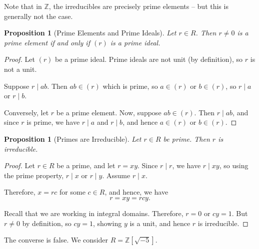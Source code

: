 \documentclass{article}
\newtheorem{proposition}[theorem]{Proposition}
\theoremstyle{definition}
\theoremstyle{remark}
\newcommand{\pqty}[1]{\left(#1\right)}
\newcommand{\bqty}[1]{\left[#1\right]}
\newcommand{\divides}{\mid}
\newcommand{\ZZ}{\mathbb{Z}}
\begin{document}
Note that in \(\ZZ\), the irreducibles are precisely prime elements -- but this is generally not the case.

\begin{proposition}[Prime Elements and Prime Ideals]
    \label{prop:prime-element-ideal}%
    Let \(r \in R\). Then \(r \neq 0\) is a prime element if and only if \(\pqty{r}\) is a prime ideal.
\end{proposition}

\begin{proof}
    Let \(\pqty{r}\) be a prime ideal. Prime ideals are not unit (by definition), so \(r\) is not a unit.

    Suppose \(r \divides ab\). Then \(ab \in \pqty{r}\) which is prime, so \(a \in \pqty{r}\) or \(b \in \pqty{r}\), so \(r \divides a\) or \(r \divides b\).

    Conversely, let \(r\) be a prime element. Now, suppose \(ab \in \pqty{r}\). Then \(r \divides ab\), and since \(r\) is prime, we have \(r \divides a\) and \(r \divides b\), and hence \(a \in \pqty{r}\) or \(b \in \pqty{r}\).
\end{proof}

\begin{proposition}[Primes are Irreducible]
    \label{prop:primes-are-irreducible}%
    Let \(r \in R\) be prime. Then \(r\) is irreducible.
\end{proposition}

\begin{proof}
    Let \(r \in R\) be a prime, and let \(r = xy\). Since \(r \divides r\), we have \(r \divides xy\), so using the prime property, \(r \divides x\) or \(r \divides y\). Assume \(r \divides x\).

    Therefore, \(x = rc\) for some \(c \in R\), and hence, we have
    \[
        r = xy = rcy.
    \]

    Recall that we are working in integral domains. Therefore, \(r = 0\) or \(cy = 1\). But \(r \neq 0\) by definition, so \(cy = 1\), showing \(y\) is a unit, and hence \(r\) is irreducible.
\end{proof}

The converse is false. We consider \(R = \ZZ\bqty{\sqrt{-5}}\).
\end{document}
